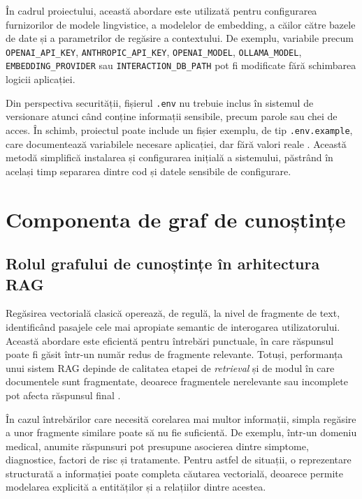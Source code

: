 \documentclass[12pt, a4paper, oneside, romanian]{teza-upb}
\begin{document}
În cadrul proiectului, această abordare este utilizată pentru configurarea furnizorilor de modele lingvistice, a modelelor de embedding, a căilor către bazele de date și a parametrilor de regăsire a contextului. De exemplu, variabile precum \texttt{OPENAI\_API\_KEY}, \texttt{ANTHROPIC\_API\_KEY}, \texttt{OPENAI\_MODEL}, \texttt{OLLAMA\_MODEL}, \texttt{EMBEDDING\_PROVIDER} sau \texttt{INTERACTION\_DB\_PATH} pot fi modificate fără schimbarea logicii aplicației.

Din perspectiva securității, fișierul \texttt{.env} nu trebuie inclus în sistemul de versionare atunci când conține informații sensibile, precum parole sau chei de acces. În schimb, proiectul poate include un fișier exemplu, de tip \texttt{.env.example}, care documentează variabilele necesare aplicației, dar fără valori reale \cite{python_dotenv_doc}. Această metodă simplifică instalarea și configurarea inițială a sistemului, păstrând în același timp separarea dintre cod și datele sensibile de configurare.

\section{Componenta de graf de cunoștințe}

\subsection{Rolul grafului de cunoștințe în arhitectura RAG}

Regăsirea vectorială clasică operează, de regulă, la nivel de fragmente de text, identificând pasajele cele mai apropiate semantic de interogarea utilizatorului. Această abordare este eficientă pentru întrebări punctuale, în care răspunsul poate fi găsit într-un număr redus de fragmente relevante. Totuși, performanța unui sistem RAG depinde de calitatea etapei de \textit{retrieval} și de modul în care documentele sunt fragmentate, deoarece fragmentele nerelevante sau incomplete pot afecta răspunsul final \cite{gao2023retrieval}.

În cazul întrebărilor care necesită corelarea mai multor informații, simpla regăsire a unor fragmente similare poate să nu fie suficientă. De exemplu, într-un domeniu medical, anumite răspunsuri pot presupune asocierea dintre simptome, diagnostice, factori de risc și tratamente. Pentru astfel de situații, o reprezentare structurată a informației poate completa căutarea vectorială, deoarece permite modelarea explicită a entităților și a relațiilor dintre acestea.
\end{document}
